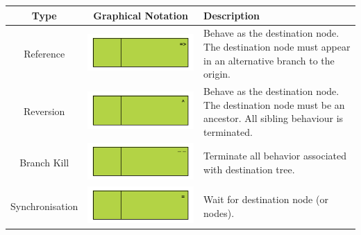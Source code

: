 \documentclass[]{article}
\begin{document}
\begin{tabularx}{\textwidth}{|c|c|X|}
\textbf{Type} & \textbf{Graphical Notation} & \textbf{Description}\\ \hline 
Reference &\includegraphics{figs/AppendixB/Operators/Reference} & Behave as the destination node. The destination node must appear in an alternative branch to the origin.\\ \hline
Reversion &\includegraphics{figs/AppendixB/Operators/Reversion} & Behave as the destination node. The destination node must be an ancestor. All sibling behaviour is terminated.\\ \hline
Branch Kill &\includegraphics{figs/AppendixB/Operators/BranchKill} & Terminate all behavior associated with destination tree.\\ \hline
Synchronisation &\includegraphics{figs/AppendixB/Operators/Synchronisation} & Wait for destination node (or nodes).\\ \hline

\end{tabularx}
\end{document}
